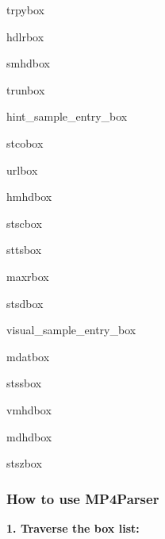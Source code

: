 \begin{DoxyItemize}
\item trpybox
\item hdlrbox
\item smhdbox
\item trunbox
\item hint\+\_\+sample\+\_\+entry\+\_\+box
\item stcobox
\item urlbox
\item hmhdbox
\item stscbox
\item sttsbox
\item maxrbox
\item stsdbox
\item visual\+\_\+sample\+\_\+entry\+\_\+box
\item mdatbox
\item stssbox
\item vmhdbox
\item mdhdbox
\item stszbox \subsubsection*{How to use M\+P4\+Parser}
\end{DoxyItemize}

{\bfseries{1. Traverse the box list\+:}}

